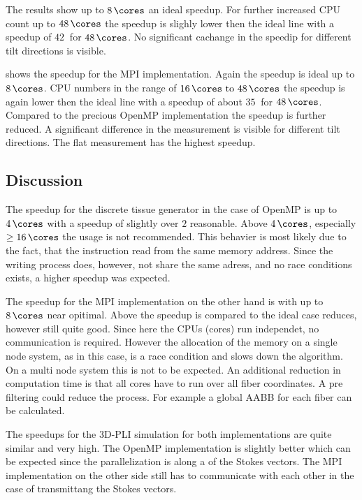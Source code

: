 The results show up to $\SI{8}{\cores}$ an ideal speedup.
For further increased \ac{CPU} count up to $\SI{48}{\cores}$ the speedup is slighly lower then the ideal line with a speedup of $\SI{42}{}$ for $\SI{48}{\cores}$.
No significant cachange in the speedip for different tilt directions is visible.
\par
% 
 shows the speedup for the \ac{MPI} implementation.
Again the speedup is ideal up to $\SI{8}{\cores}$.
\ac{CPU} numbers in the range of $\SIrange{16}{48}{\cores}$ the speedup is again lower then the ideal line with a speedup of about $\SI{35}{}$ for $\SI{48}{\cores}$.
Compared to the precious \ac{OpenMP} implementation the speedup is further reduced.
A significant difference in the measurement is visible for different tilt directions.
The flat measurement has the highest speedup.
%
%
%
\subsection{Discussion}
%
The speedup for the discrete tissue generator in the case of \ac{OpenMP} is up to $\SI{4}{\cores}$ with a speedup of slightly over $\num{2}$ reasonable.
Above $\SI{4}{\cores}$, especially $\geq \SI{16}{\cores}$ the usage is not recommended.
This behavier is most likely due to the fact, that the instruction read from the same memory address.
Since the writing process does, however, not share the same adress, and no race conditions exists, a higher speedup was expected.
\par
% 
The speedup for the \ac{MPI} implementation on the other hand is with up to $\SI{8}{\cores}$ near opitimal.
Above the speedup is compared to the ideal case reduces, however still quite good.
Since here the \acp{CPU} (cores) run independet, no communication is required.
However the allocation of the memory on a single node system, as in this case, is a race condition and slows down the algorithm.
On a multi node system this is not to be expected.
An additional reduction in computation time is that all cores have to run over all fiber coordinates.
A pre filtering could reduce the process.
For example a global \ac{AABB} for each fiber can be calculated.
\par
% 
The speedups for the \ac{3D-PLI} simulation for both implementations are quite similar and very high.
The \ac{OpenMP} implementation is slightly better which can be expected since the parallelization is along a  of the Stokes vectors.
The \ac{MPI} implementation on the other side still has to communicate with each other in the case of transmittang the Stokes vectors.
